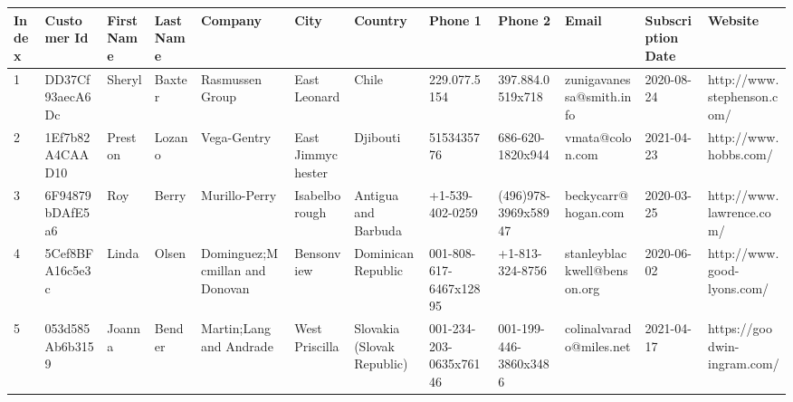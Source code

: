 \documentclass[11pt,a4paper]{article}
\begin{document}
\begin{table}[h]
\begin{tabular}{|l|l|l|l|l|l|l|l|l|l|l|l|}
\hline
Index & Customer Id & First Name & Last Name & Company & City & Country & Phone 1 & Phone 2 & Email & Subscription Date & Website \\ \hline
1 & DD37Cf93aecA6Dc & Sheryl & Baxter & Rasmussen Group & East Leonard & Chile & 229.077.5154 & 397.884.0519x718 & zunigavanessa@smith.info & 2020-08-24 & http://www.stephenson.com/ \\ \hline
2 & 1Ef7b82A4CAAD10 & Preston & Lozano & Vega-Gentry & East Jimmychester & Djibouti & 5153435776 & 686-620-1820x944 & vmata@colon.com & 2021-04-23 & http://www.hobbs.com/ \\ \hline
3 & 6F94879bDAfE5a6 & Roy & Berry & Murillo-Perry & Isabelborough & Antigua and Barbuda & +1-539-402-0259 & (496)978-3969x58947 & beckycarr@hogan.com & 2020-03-25 & http://www.lawrence.com/ \\ \hline
4 & 5Cef8BFA16c5e3c & Linda & Olsen & Dominguez;Mcmillan and Donovan & Bensonview & Dominican Republic & 001-808-617-6467x12895 & +1-813-324-8756 & stanleyblackwell@benson.org & 2020-06-02 & http://www.good-lyons.com/ \\ \hline
5 & 053d585Ab6b3159 & Joanna & Bender & Martin;Lang and Andrade & West Priscilla & Slovakia (Slovak Republic) & 001-234-203-0635x76146 & 001-199-446-3860x3486 & colinalvarado@miles.net & 2021-04-17 & https://goodwin-ingram.com/ \\ \hline
\end{tabular}
\end{table}
\end{document}
